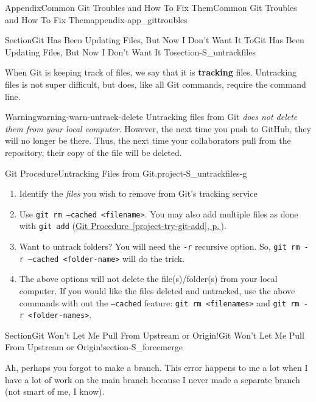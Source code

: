 \documentclass[twoside,10pt,]{book}
\newcommand{\xreffont}{\relax}
\newcommand{\mono}[1]{\texttt{#1}}
\newcommand{\terminology}[1]{\textbf{#1}}
\begin{document}
\begin{appendixptx}{Appendix}{Common Git Troubles and How To Fix Them}{}{Common Git Troubles and How To Fix Them}{}{}{appendix-app_gittroubles}
\begin{sectionptx}{Section}{Git Has Been Updating Files, But Now I Don't Want It To}{}{Git Has Been Updating Files, But Now I Don't Want It To}{}{}{section-S_untrackfiles}
\par
When Git is keeping track of files, we say that it is \terminology{tracking} files. Untracking files is not super difficult, but does, like all Git commands, require the command line.%
\begin{warning}{Warning}{}{warning-warn-untrack-delete}%
Untracking files from Git \emph{does not delete them from your local computer}. However, the next time you push to GitHub, they will no longer be there. Thus, the next time your collaborators pull from the repository, their copy of the file will be deleted.%
\end{warning}
\begin{project}{Git Procedure}{Untracking Files from Git.}{project-S_untrackfiles-g}%
\begin{enumerate}[font=\bfseries,label=(\alph*),ref=\alph*]%
\item{}Identify the \emph{files} you wish to remove from Git's tracking service%
\item{}Use \mono{git rm --cached <filename>}. You may also add multiple files as done with \mono{git add} (\hyperref[project-try-git-add]{Git Procedure~{\xreffont\ref{project-try-git-add}}, p.\,\pageref{project-try-git-add}}).%
\item{}Want to untrack folders? You will need the \mono{-r} recursive option. So, \mono{git rm -r --cached <folder-name>} will do the trick.%
\item{}The above options will not delete the file(s)\slash{}folder(s) from your local computer. If you would like the files deleted and untracked, use the above commands with out the \mono{--cached} feature: \mono{git rm <filenames>} and \mono{git rm -r <folder-names>}.%
\end{enumerate}%
\end{project}%
\end{sectionptx}
%
%
\typeout{************************************************}
\typeout{************************************************}
%
\begin{sectionptx}{Section}{Git Won't Let Me Pull From Upstream or Origin!}{}{Git Won't Let Me Pull From Upstream or Origin!}{}{}{section-S_forcemerge}
%
%
%
%
%
\begin{introduction}{}%
Ah, perhaps you forgot to make a branch. This error happens to me a lot when I have a lot of work on the main branch because I never made a separate branch (not smart of me, I know).%

\end{introduction}
\end{sectionptx}
\end{appendixptx}
\end{document}
